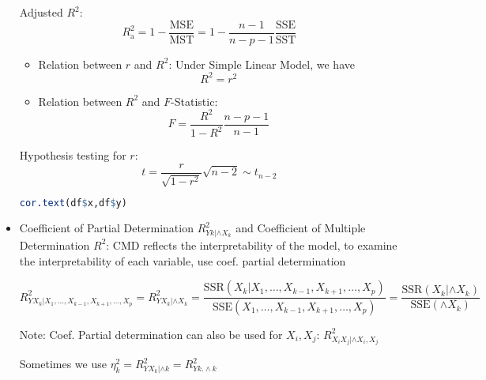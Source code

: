 \begin{itemize}[topsep=2pt,itemsep=2pt]
    Adjusted $ R^2 $:
    \begin{equation}
        R^2_\mathrm{a}=1-\dfrac{\mathrm{MSE}}{\mathrm{MST}} =1-\dfrac{n-1}{n-p-1}\dfrac{\mathrm{SSE}}{\mathrm{SST}}
    \end{equation}
    
    \begin{itemize}[topsep=2pt,itemsep=2pt]
        \item Relation between $ r $ and $ R^2 $: Under Simple Linear Model, we have 
        \begin{equation}
            R^2=r^2 
        \end{equation}
        \item Relation between $ R^2 $ and $ F $-Statistic:
        \begin{equation}
            F=\dfrac{R^2}{1-R^2}\dfrac{n-p-1}{n-1} 
        \end{equation}
    \end{itemize}

    Hypothesis testing for $ r $: 
    \[
        t=\dfrac{r}{\sqrt{1-r^2}}\sqrt{n-2}\sim t_{n-2} 
    \]

\begin{rcode}
\begin{lstlisting}[language=R]
cor.text(df$x,df$y)
\end{lstlisting}
\end{rcode}
    


\item Coefficient of Partial Determination $ R^2_{Yk|\wedge X_k} $ and Coefficient of Multiple Determination $ R^2 $:
    CMD reflects the interpretability of the model, to examine the interpretability of each variable, use coef. partial determination

\begin{equation}
    R^2_{YX_k|X_1,\ldots,X_{k-1},X_{k+1},\ldots,X_p}=R^2_{YX_k|\wedge X_k}=\dfrac{\mathrm{SSR}(X_k|X_1,\ldots,X_{k-1},X_{k+1},\ldots,X_p) }{\mathrm{SSE}(X_1,\ldots,X_{k-1},X_{k+1},\ldots,X_p) }=\dfrac{\mathrm{SSR}(X_k|\wedge X_k) }{\mathrm{SSE}(\wedge X_k) }
\end{equation}

    Note: Coef. Partial determination can also be used for $ X_i,X_j $: $ R^2_{X_iX_j|\wedge X_i,X_j} $

    Sometimes we use $ \eta^2_k=R^2_{YX_k|\wedge k}=R^2_{Yk.\wedge k} $


\end{itemize}
